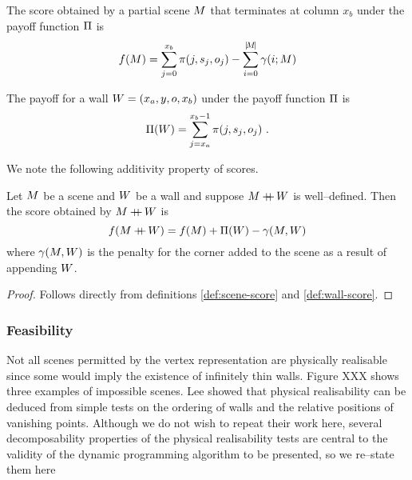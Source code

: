 \begin{definition}
  \label{def:scene-score}
  The score obtained by a partial scene $\PartialScene$ that
  terminates at column $x_b$ under the payoff function $\ScenePayoff$
  is
  \begin{equation}
    \Objective(\PartialScene) = \sum_{j=0}^{x_b} 
      \PixelPayoff(j,\seam_j,\WallOrient_j) - 
      \sum_{i=0}^{\SceneLen} \CornerPenalty(i;\PartialScene)
  \end{equation}
\end{definition}

\begin{definition}
  \label{def:wall-score}
  The payoff for a wall $\Wall=(x_a,y,\WallOrient,x_b)$ under the
  payoff function $\ScenePayoff$ is
  \begin{equation}
    \WallPayoff(\Wall) = \sum_{j=x_a}^{x_b-1}
      \PixelPayoff(j,\seam_j,\WallOrient_j) ~.
  \end{equation}
\end{definition}

We note the following additivity property of scores.

\begin{lemma}
  \label{lemma:additive-scores}
  Let $\Scene$ be a scene and $\Wall$ be a wall and suppose
  $\Scene\concat\Wall$ is well--defined. Then the score obtained by
  $\Scene\concat\Wall$ is
  \begin{equation}
    \Objective(\Scene\concat\Wall) = 
      \Objective(\Scene) + \WallPayoff(\Wall) - 
      \CornerPenalty(\Scene,\Wall)
  \end{equation}
  where $\CornerPenalty(\Scene,\Wall)$ is the penalty
  for the corner added to the scene as a result of appending $\Wall$.
\end{lemma}
\begin{proof}
  Follows directly from definitions \ref{def:scene-score} and
  \ref{def:wall-score}.
\end{proof}

\subsubsection{Feasibility}

Not all scenes permitted by the vertex representation are physically
realisable since some would imply the existence of infinitely thin
walls. Figure XXX shows three examples of impossible scenes. Lee \etal
\cite{Lee09} showed that physical realisability can be deduced from
simple tests on the ordering of walls and the relative positions of
vanishing points. Although we do not wish to repeat their work here,
several decomposability properties of the physical realisability tests
are central to the validity of the dynamic programming algorithm to be
presented, so we re--state them here

